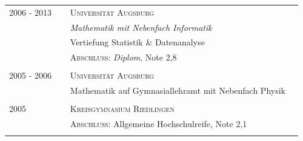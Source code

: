 \documentclass[a4paper,10pt]{article} %
\begin{document}
\begin{tabular}{R{0.2\linewidth}p{0.76\linewidth}}
2006 - 2013 & \textsc{Universität Augsburg}\\
& \emph{Mathematik mit Nebenfach Informatik}\\
& Vertiefung Statistik \& Datenanalyse\\
&\normalsize \textsc{Abschluss}: \emph{Diplom}, Note 2,8\\ %
&\\

2005 - 2006 & \textsc{Universität Augsburg}\\
& Mathematik auf Gymnasiallehramt mit Nebenfach Physik\\
&\\

\textsc{2005} & \textsc{Kreisgymnasium Riedlingen}\\
& \textsc{Abschluss}: Allgemeine Hochschulreife, Note 2,1 \\ %
&\\
\end{tabular}


%
%

\end{document}
